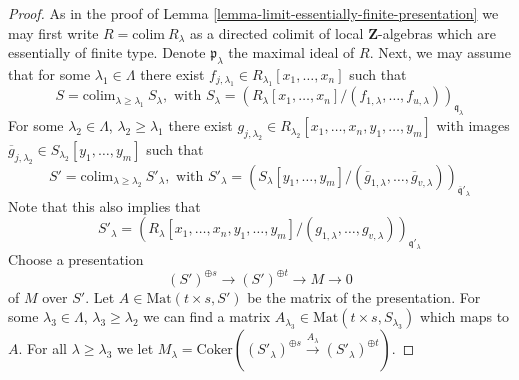 \begin{proof}
As in the proof of Lemma \ref{lemma-limit-essentially-finite-presentation}
we may first write $R = \text{colim}\ R_\lambda$ as a directed colimit
of local $\mathbf{Z}$-algebras which are essentially of finite type.
Denote $\mathfrak p_\lambda$ the maximal ideal of $R$.
Next, we may assume that for some $\lambda_1 \in \Lambda$ there
exist $f_{j, \lambda_1} \in R_{\lambda_1}[x_1, \ldots, x_n]$
such that
$$
S =
\text{colim}_{\lambda \geq \lambda_1}\ S_\lambda, \text{ with }
S_\lambda =
(R_\lambda[x_1, \ldots, x_n]/
(f_{1, \lambda}, \ldots, f_{u, \lambda}))_{\mathfrak q_\lambda}
$$
For some $\lambda_2 \in \Lambda$,
$\lambda_2 \geq \lambda_1$ there exist
$g_{j, \lambda_2} \in R_{\lambda_2}[x_1, \ldots, x_n, y_1, \ldots, y_m]$
with images
$\overline{g}_{j, \lambda_2} \in S_{\lambda_2}[y_1, \ldots, y_m]$
such that
$$
S' =
\text{colim}_{\lambda \geq \lambda_2}\ S'_\lambda, \text{ with }
S'_\lambda =
(S_\lambda[y_1, \ldots, y_m]/
(\overline{g}_{1, \lambda}, \ldots,
\overline{g}_{v, \lambda}))_{\overline{\mathfrak q}'_\lambda}
$$
Note that this also implies that
$$
S'_\lambda =
(R_\lambda[x_1, \ldots, x_n, y_1, \ldots, y_m]/
(g_{1, \lambda}, \ldots, g_{v, \lambda}))_{\mathfrak q'_\lambda}
$$
Choose a presentation
$$
(S')^{\oplus s} \to (S')^{\oplus t} \to M \to 0
$$
of $M$ over $S'$. Let $A \in \text{Mat}(t\times s, S')$ be
the matrix of the presentation. For some $\lambda_3 \in \Lambda$,
$\lambda_3 \geq \lambda_2$
we can find a matrix $A_{\lambda_3} \in \text{Mat}(t\times s, S_{\lambda_3})$
which maps to $A$. For all $\lambda \geq \lambda_3$ we let
$M_\lambda = \text{Coker}((S'_\lambda)^{\oplus s} \xrightarrow{A_\lambda}
(S'_\lambda)^{\oplus t})$.


\end{proof}
